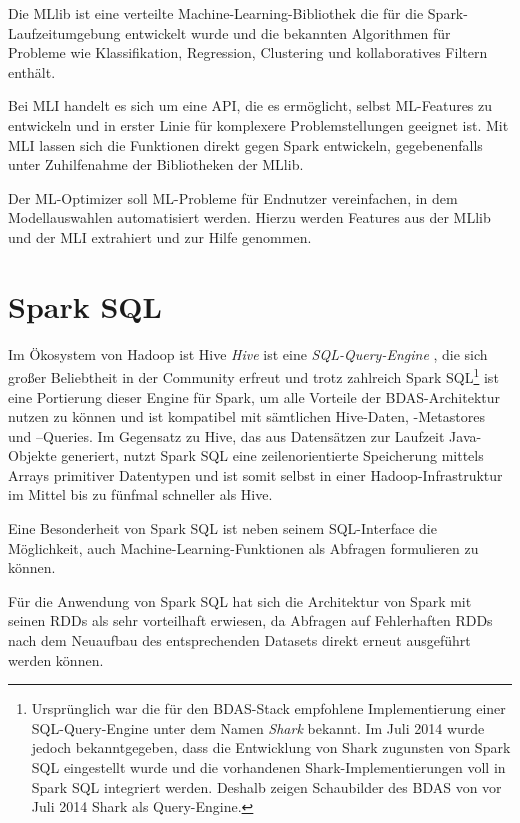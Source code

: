 Die MLlib ist eine verteilte Machine-Learning-Bibliothek die für die Spark-Laufzeitumgebung entwickelt wurde und die bekannten Algorithmen für Probleme wie Klassifikation, Regression, Clustering und kollaboratives Filtern enthält.

Bei MLI handelt es sich um eine API, die es ermöglicht, selbst ML-Features zu entwickeln und in erster Linie für komplexere Problemstellungen geeignet ist. Mit MLI lassen sich die Funktionen direkt gegen Spark entwickeln, gegebenenfalls unter Zuhilfenahme der Bibliotheken der MLlib.

Der ML-Optimizer soll ML-Probleme für Endnutzer vereinfachen, in dem Modellauswahlen automatisiert werden. Hierzu werden Features aus der MLlib und der MLI extrahiert und zur Hilfe genommen.



\section{Spark SQL}
\label{section:spark SQL}


Im Ökosystem von Hadoop ist Hive \textit{Hive} ist eine \textit{SQL-Query-Engine} , die sich großer Beliebtheit in der Community erfreut und trotz zahlreich  Spark SQL\footnote{Ursprünglich war die für den BDAS-Stack empfohlene Implementierung einer SQL-Query-Engine unter dem Namen \textit{Shark} bekannt. Im Juli 2014 wurde jedoch bekanntgegeben, dass die Entwicklung von Shark zugunsten von Spark SQL eingestellt wurde und die vorhandenen Shark-Implementierungen voll in Spark SQL integriert werden. Deshalb zeigen Schaubilder des BDAS von vor Juli 2014 Shark als Query-Engine.} ist eine Portierung dieser Engine für Spark, um alle Vorteile der BDAS-Architektur nutzen zu können und ist kompatibel mit sämtlichen Hive-Daten, -Metastores und –Queries. Im Gegensatz zu Hive, das aus Datensätzen zur Laufzeit Java-Objekte generiert, nutzt Spark SQL eine zeilenorientierte Speicherung mittels Arrays primitiver Datentypen und ist somit selbst in einer Hadoop-Infrastruktur im Mittel bis zu fünfmal schneller als Hive. 

Eine Besonderheit von Spark SQL ist neben seinem SQL-Interface die Möglichkeit, auch Machine-Learning-Funktionen als Abfragen formulieren zu können. 

Für die Anwendung von Spark SQL hat sich die Architektur von Spark mit seinen RDDs als sehr vorteilhaft erwiesen, da Abfragen auf Fehlerhaften RDDs nach dem Neuaufbau des entsprechenden Datasets direkt erneut ausgeführt werden können. 

